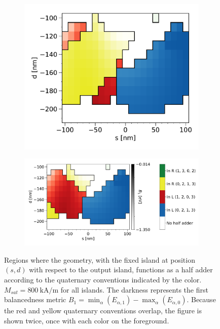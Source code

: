 \documentclass[11pt,a4paper,english]{article}
\begin{document}
\begin{figure}
\centering
\begin{subfigure}[t]{0.37\textwidth}
    \includegraphics[width=\textwidth]{Figures/half_adder/sweep/000006_d-s/table(d100-210_10,s-100-100_10)_balanced1_reversedForeground.pdf}
\end{subfigure}
\begin{subfigure}[t]{0.62\textwidth}
    \includegraphics[width=\textwidth]{Figures/half_adder/sweep/000006_d-s/table(d100-210_10,s-100-100_10)_balanced1.pdf}
\end{subfigure}
\caption{Regions where the geometry, with the fixed island at position $(s, d)$ with respect to the output island, functions as a half adder according to the quaternary conventions indicated by the color. $M_{sat} = \SI{800}{\kilo\ampere\per\metre}$ for all islands. The darkness represents the first balancedness metric $B_1 = \min_\alpha(E_{\alpha,1}) - \max_\alpha(E_{\alpha,0})$. Because the red and yellow quaternary conventions overlap, the figure is shown twice, once with each color on the foreground.}
\label{fig:HalfAdder_000006_sweep_d-s_balanced1}
\end{figure}
\end{document}
